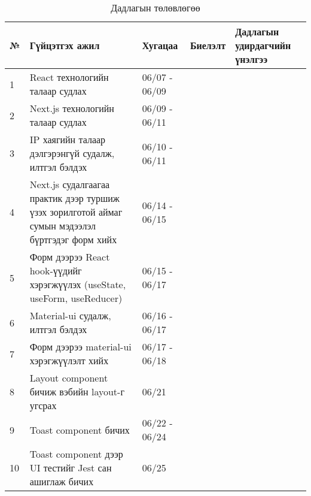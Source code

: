 \begin{table}[h]
\caption{Дадлагын төлөвлөгөө}
\begin{tabular}{|p{0.5cm}|p{8cm}|l|l|p{3cm}|}
\hline
\textbf{№} & \textbf{Гүйцэтгэх ажил} & \textbf{Хугацаа} & \textbf{Биелэлт} & \textbf{Дадлагын удирдагчийн үнэлгээ} \\ \hline
1 & React технологийн талаар судлах & 06/07 - 06/09 && \\ \hline
2 & Next.js технологийн талаар судлах & 06/09 - 06/11 && \\ \hline
3 & IP хаягийн талаар дэлгэрэнгүй судалж, илтгэл бэлдэх & 06/10 - 06/11 && \\ \hline
4 & Next.js судалгаагаа практик дээр туршиж үзэх зорилготой аймаг сумын мэдээлэл бүртгэдэг форм хийх & 06/14 - 06/15 && \\ \hline
5 & Форм дээрээ React hook-үүдийг хэрэгжүүлэх (useState, useForm, useReducer) & 06/15 - 06/17 && \\ \hline
6 & Material-ui судалж, илтгэл бэлдэх & 06/16 - 06/17 && \\ \hline
7 & Форм дээрээ material-ui хэрэгжүүлэлт хийх & 06/17 - 06/18 && \\ \hline
8 & Layout component бичиж вэбийн layout-г угсрах & 06/21 && \\ \hline
9 & Toast component бичих & 06/22 - 06/24 && \\ \hline
10 & Toast component дээр UI тестийг Jest сан ашиглаж бичих & 06/25 && \\ \hline
\end{tabular}
\end{table}

